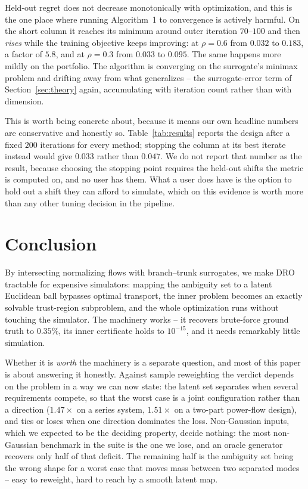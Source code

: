 \documentclass[11pt]{article}
\begin{document}
Held-out regret does not decrease monotonically with optimization, and this is the one
place where running Algorithm~1 to convergence is actively harmful. On the short column it reaches its
minimum around outer iteration $70$--$100$ and then \emph{rises} while the training
objective keeps improving: at $\rho=0.6$ from $0.032$ to $0.183$, a factor of $5.8$, and at
$\rho=0.3$ from $0.033$ to $0.095$. The same happens more mildly on the portfolio. The algorithm is
converging on the surrogate's minimax problem and drifting away from what generalizes --
the surrogate-error term of Section~\ref{sec:theory} again, accumulating with iteration
count rather than with dimension.

This is worth being concrete about, because it means our own headline numbers are
conservative and honestly so. Table~\ref{tab:results} reports the design after a fixed
$200$ iterations for every method; stopping the column at its best iterate instead would give
$0.033$ rather than $0.047$. We do not report that number as the result, because choosing
the stopping point requires the held-out shifts the metric is computed on, and no user has
them. What a user does have is the option to hold out a shift they can afford to simulate,
which on this evidence is worth more than any other tuning decision in the pipeline.

\section{Conclusion}
By intersecting normalizing flows with branch--trunk surrogates, we make DRO tractable for
expensive simulators: mapping the ambiguity set to a latent Euclidean ball bypasses optimal
transport, the inner problem becomes an exactly solvable trust-region subproblem, and the
whole optimization runs without touching the simulator. The machinery works -- it recovers
brute-force ground truth to $0.35\%$, its inner certificate holds to $10^{-15}$, and it
needs remarkably little simulation.

Whether it is \emph{worth} the machinery is a separate question, and most of this paper is
about answering it honestly. Against sample reweighting the verdict depends on the problem
in a way we can now state: the latent set separates when several requirements compete, so
that the worst case is a joint configuration rather than a direction ($1.47\times$ on a
series system, $1.51\times$ on a two-part power-flow design), and ties or loses when one
direction dominates the loss. Non-Gaussian inputs, which we expected to be the deciding
property, decide nothing: the most non-Gaussian benchmark in the suite is the one we lose,
and an oracle generator recovers only half of that deficit. The remaining half is the
ambiguity set being the wrong shape for a worst case that moves mass between two separated
modes -- easy to reweight, hard to reach by a smooth latent map.
\end{document}
